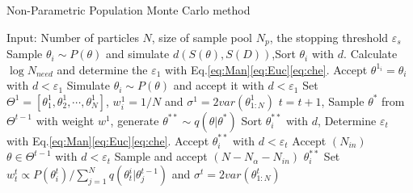 \documentclass[review]{elsarticle}
\begin{document}
\begin{algorithm}
\caption{Non-Parametric Population Monte Carlo method}
\label{al:2}
\begin{algorithmic}[1]
\STATE Input: Number of particles $N$, size of sample pool $N_p$, the stopping threshold $\varepsilon_s$
    \STATE Sample $\theta_i \sim P(\theta)$ and simulate $d(S(\theta),S(D))$,Sort $\theta_i$ with $d$.
    \STATE Calculate $\log{N_{need}}$ and determine the $\varepsilon_1$ with Eq.\ref{eq:Man}\ref{eq:Euc}\ref{eq:che}.
    \STATE Accept $\theta^{1_i} = \theta_i$ with $d < \varepsilon_1$
\ENDFOR
{}
    \STATE Simulate $\theta_i \sim P(\theta)$ and accept it with $d<\varepsilon_1$
\ENDFOR
\STATE Set $\Theta^{1} = [\theta^1_1,\theta^1_2,\cdots, \theta^1_N]$, $w^1_i = 1/N$ and $\sigma^1 = 2 var(\theta^1_{1:N})$
    \STATE $t=t+1$, Sample $\theta^*$ from $\Theta^{t-1}$ with weight $w^1$, generate $\theta^{**} \sim q(\theta|\theta^*)$
    \STATE Sort $\theta^{**}_i$ with $d$, Determine $\varepsilon_t$ with Eq.\ref{eq:Man}\ref{eq:Euc}\ref{eq:che}.
    \STATE Accept $\theta^{**}_i$ with $d < \varepsilon_t$
    \STATE Accept $(N_{in})$ $\theta \in \Theta^{t-1}$ with $d < \varepsilon_t$
        \STATE Sample and accept $(N-N_\alpha-N_{in})$ $\theta^{**}_i$
    \ENDIF
    \STATE Set $w_t^t\propto P(\theta^{t}_i)/\sum_{j=1}^{N}q(\theta_t^i|\theta_j^{t-1})$ and $\sigma^t = 2 var(\theta^{t}_{1:N})$
\ENDWHILE
\end{algorithmic}
\end{algorithm}
\end{document}
